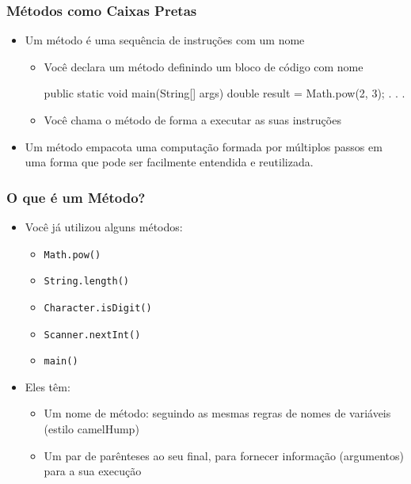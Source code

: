\documentclass[xcolor={dvipsnames,table},aspectratio=169]{beamer}
\begin{document}
\begin{frame}[fragile]\frametitle{Métodos como Caixas Pretas}
\begin{itemize}
	\item Um método é uma sequência de instruções com um nome
	\begin{itemize}
		\item Você declara um método definindo um bloco de código com nome
\begin{javacode}
public static void main(String[] args) {
  double result = Math.pow(2, 3);
  . . .
}
\end{javacode}
		\item Você chama o método de forma a executar as suas instruções
	\end{itemize}
	\item Um método empacota uma computação formada por múltiplos passos em uma forma que pode ser facilmente entendida e reutilizada.
\end{itemize}
\end{frame}

\begin{frame}\frametitle{O que é um Método?}
\begin{itemize}
	\item Você já utilizou alguns métodos:
	\begin{itemize}
		\item \texttt{Math.pow()}
		\item \texttt{String.length()}
		\item \texttt{Character.isDigit()}
		\item \texttt{Scanner.nextInt()}
		\item \texttt{main()}
	\end{itemize}
	\item Eles têm:
	\begin{itemize}
		\item Um nome de método: seguindo as mesmas regras de nomes de variáveis (estilo camelHump)
		\item Um par de parênteses ao seu final, para fornecer informação (argumentos) para a sua execução
	\end{itemize}
\end{itemize}
\end{frame}
\end{document}

